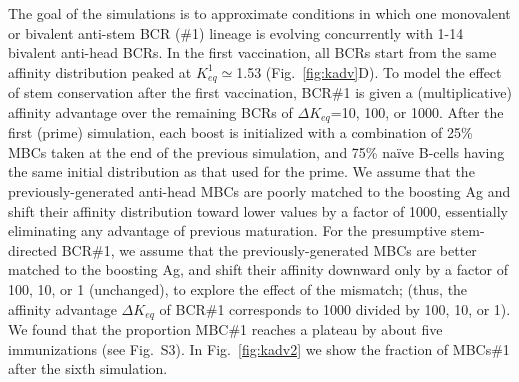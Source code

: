 \documentclass[utf8]{frontiersHLTH}%
\newcommand{\vo}[1]{#1} %
\newcommand{\fig}[1]{Fig.~\ref{fig:#1}}
\begin{document}
\vo{The goal of the simulations is to approximate conditions in which
one monovalent or bivalent anti-stem BCR (\#1) lineage is evolving concurrently with
1-14 bivalent anti-head BCRs.}
In the first vaccination, all BCRs start
from the same affinity distribution peaked at $K^1_{eq}\simeq$1.53 (\fig{kadv}D). To model
the effect of stem conservation after the first vaccination, BCR\#1 is
given a (multiplicative) affinity advantage over the remaining BCRs of $\Delta K_{eq}$=10, 100, or 1000.
After the first (prime) simulation, each boost is initialized with a
combination of 25\% MBCs taken at the end of the previous simulation,
and 75\% na\"ive B-cells having the same initial distribution as that used for the prime. We assume that
the previously-generated anti-head MBCs are poorly matched to the
boosting Ag and shift their affinity distribution toward lower values by
a factor of 1000, essentially eliminating any advantage of previous
maturation. For the presumptive stem-directed BCR\#1, we assume that the
previously-generated MBCs are better matched to the boosting Ag, and
shift their affinity downward only by a factor of 100, 10, or 1 (unchanged), to explore
the effect of the mismatch; (thus, the affinity advantage $\Delta K_{eq}$ of BCR\#1 corresponds to 1000
divided by 100, 10, or 1).
We found that the proportion MBC\#1 reaches a plateau by about
five immunizations (see Fig.~S3). In \fig{kadv2} we show the
fraction of MBCs\#1 after the sixth simulation.
\end{document}
